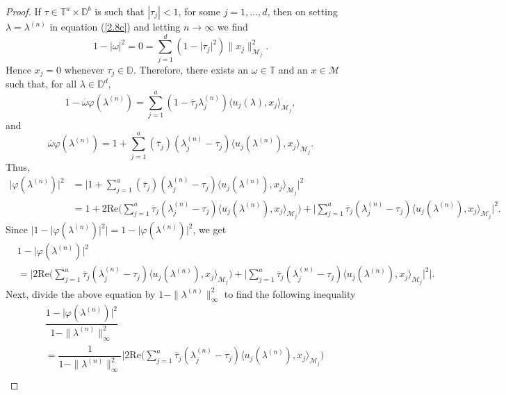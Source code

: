 \documentclass[11pt, reqno]{amsart}
\newcommand\1{\boldsymbol {1}}
\newcommand\la{\lambda}
\numberwithin{equation}{section}
\begin{document}
\begin{proof}
If $\tau\in\mathbb{T}^{a}\times \mathbb{D}^{b}$ is  such that  $|\tau_j| < 1$, for some $j=1,\hdots,d$, then on setting $\la=\lambda^{(n)}$ in equation (\ref{2.8c}) and letting $n\to \infty$ we find 
$$1-\lvert\omega\rvert^{2}=0=\sum_{j=1}^{d}(1-\lvert\tau_{j}\rvert^{2})\| x_{j}\|^{2}_{\mathcal{M}_{j}}.$$
Hence $x_{j}=0$ whenever $\tau_{j}\in\mathbb{D}$. 
Therefore, there exists an $\omega\in\mathbb{T}$ and an $x\in\mathcal{M}$ such that, for all $\lambda\in\mathbb{D}^{d}$,
$$1-\overline{\omega}\varphi(\lambda^{(n)})=\sum_{j=1}^{a}(1-\overline{\tau}_{j}\lambda^{(n)}_{j})\langle u_{j}(\lambda),x_{j}\rangle_{\mathcal{M}_{j}},$$
and 
$$\overline{\omega}\varphi(\lambda^{(n)})= 1+\sum_{j=1}^{a}(\overline{\tau}_{j})(\lambda^{(n)}_{j}-\tau_{j})\langle u_{j}(\lambda^{(n)}),x_{j}\rangle_{\mathcal{M}_{j}}.$$
Thus,
\begin{align*}
\lvert \varphi(\lambda^{(n)})\rvert^{2} &=\bigg\lvert 1+\sum_{j=1}^{a}(\overline{\tau}_{j})(\lambda^{(n)}_{j}-\tau_{j})\langle u_{j}(\lambda^{(n)}),x_{j}\rangle_{\mathcal{M}_{j}}\bigg\rvert^{2}\\
&=1+2\mathrm{Re}\bigg(\sum_{j=1}^{a}\overline{\tau}_{j}(\lambda^{(n)}_{j}-\tau_{j})\langle u_{j}(\lambda^{(n)}),x_{j}\rangle_{\mathcal{M}_{j}}\bigg)+\bigg\lvert \sum_{j=1}^{a}\overline{\tau}_{j}(\lambda^{(n)}_{j}-\tau_{j})\langle u_{j}(\lambda^{(n)}),x_{j}\rangle_{\mathcal{M}_{j}} \bigg\rvert^{2}.
\end{align*}
Since $\lvert 1-\lvert\varphi(\lambda^{(n)})\rvert^{2}\rvert  = 1-\lvert\varphi(\lambda^{(n)})\rvert^{2}$, we get
\begin{align*}
    & 1-\lvert \varphi(\lambda^{(n)})\rvert^{2} \\
    &=\Bigg\lvert 2\mathrm{Re}\bigg(\sum_{j=1}^{a}\overline{\tau}_{j}(\lambda^{(n)}_{j}-\tau_{j})\langle u_{j}(\lambda^{(n)}),x_{j}\rangle_{\mathcal{M}_{j}}\bigg)+\bigg\lvert \sum_{j=1}^{a}\overline{\tau}_{j}(\lambda^{(n)}_{j}-\tau_{j})\langle u_{j}(\lambda^{(n)}),x_{j}\rangle_{\mathcal{M}_{j}} \bigg\rvert^{2}\Bigg\rvert.
\end{align*}
Next, divide the above equation by $1-\|\lambda^{(n)}\|_{\infty}^{2}$ to find the following inequality
\begin{align}
    &\dfrac{1-\lvert \varphi(\lambda^{(n)})\rvert^{2}}{1-\|\lambda^{(n)}\|_{\infty}^{2}} \nonumber\\
    &= \dfrac{1}{1-\|\lambda^{(n)}\|_{\infty}^{2}}\Bigg\lvert 2\mathrm{Re}\bigg(\sum_{j=1}^{a}\overline{\tau}_{j}(\lambda^{(n)}_{j}-\tau_{j})\langle u_{j}(\lambda^{(n)}),x_{j}\rangle_{\mathcal{M}_{j}}\bigg)\nonumber\\  

\end{align}
\end{proof}
\end{document}
